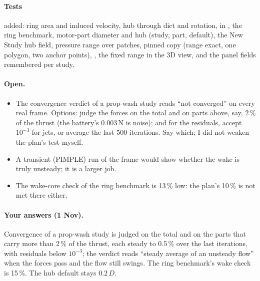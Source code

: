\paragraph{Tests} added: ring area and induced velocity, hub through  dict and rotation,  in
, the ring benchmark, motor-part diameter and hub (study, part, default), the New Study hub field,
pressure range over patches, pinned copy (range exact, one polygon, two anchor points), , the
fixed range in the 3D view, and the panel fields remembered per study.

\paragraph{Open.}
\begin{itemize}[nosep]
  \item The convergence verdict of a prop-wash study reads ``not converged'' on every real frame. Options: judge the forces on the
        total and on parts above, say, 2\,\% of the thrust (the battery's 0.003\,N is noise); and for the residuals, accept
        $10^{-3}$ for jets, or average the last 500 iterations. Say which; I did not weaken the plan's test myself.
  \item A transient (PIMPLE) run of the frame would show whether the wake is truly unsteady; it is a larger job.
  \item The wake-core check of the ring benchmark is 13\,\% low: the plan's 10\,\% is not met there either.
\end{itemize}

\paragraph{Your answers (1 Nov).} Convergence of a prop-wash study is judged on the total and on the parts that carry more
than 2\,\% of the thrust, each steady to 0.5\,\% over the last iterations, with residuals below $10^{-3}$; the verdict reads
``steady average of an unsteady flow'' when the forces pass and the flow still swings. The ring benchmark's wake check is
15\,\%. The hub default stays $0.2\,D$.


